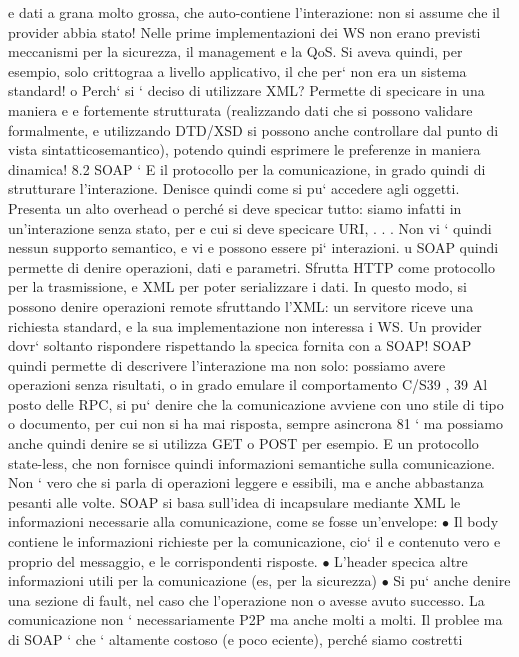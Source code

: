 \documentclass[a4paper,12pt]{article}
\begin{document}
e
dati a grana molto grossa, che auto-contiene l'interazione: non si assume che il
provider abbia stato!
Nelle prime implementazioni dei WS non erano previsti meccanismi per la
sicurezza, il management e la QoS. Si aveva quindi, per esempio, solo crittograa
a livello applicativo, il che per` non era un sistema standard!
o
Perch` si ` deciso di utilizzare XML? Permette di specicare in una maniera
e e
fortemente strutturata (realizzando dati che si possono validare formalmente, e
utilizzando DTD/XSD si possono anche controllare dal punto di vista sintatticosemantico), potendo quindi esprimere le
preferenze in maniera dinamica!
8.2
SOAP
`
E il protocollo per la comunicazione, in grado quindi di strutturare l'interazione.
Denisce quindi come si pu` accedere agli oggetti. Presenta un alto overhead
o
perché si deve specicar tutto: siamo infatti in un'interazione senza stato, per
e
cui si deve specicare URI, . . . Non vi ` quindi nessun supporto semantico, e vi
e
possono essere pi` interazioni.
u
SOAP quindi permette di denire operazioni, dati e parametri. Sfrutta
HTTP come protocollo per la trasmissione, e XML per poter serializzare i dati.
In questo modo, si possono denire operazioni remote sfruttando l'XML: un
servitore riceve una richiesta standard, e la sua implementazione non interessa i
WS. Un provider dovr` soltanto rispondere rispettando la specica fornita con
a
SOAP!
SOAP quindi permette di descrivere l'interazione ma non solo: possiamo
avere operazioni senza risultati, o in grado emulare il comportamento C/S39 ,
39 Al posto delle RPC, si pu` denire che la comunicazione avviene con uno stile di tipo
o
documento, per cui non si ha mai risposta, sempre asincrona
81
`
ma possiamo anche quindi denire se si utilizza GET o POST per esempio. E
un protocollo state-less, che non fornisce quindi informazioni semantiche sulla
comunicazione. Non ` vero che si parla di operazioni leggere e essibili, ma
e
anche abbastanza pesanti alle volte.
SOAP si basa sull'idea di incapsulare mediante XML le informazioni necessarie alla comunicazione, come se fosse
un'envelope:
$\bullet$ Il body contiene le informazioni richieste per la comunicazione, cio` il
e
contenuto vero e proprio del messaggio, e le corrispondenti risposte.
$\bullet$ L'header specica altre informazioni utili per la comunicazione (es, per la
sicurezza)
$\bullet$ Si pu` anche denire una sezione di fault, nel caso che l'operazione non
o
avesse avuto successo.
La comunicazione non ` necessariamente P2P ma anche molti a molti. Il problee
ma di SOAP ` che ` altamente costoso (e poco eciente), perché siamo costretti
\end{document}
